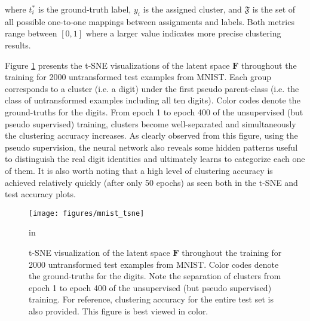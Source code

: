 \documentclass{article} \usepackage{iclr2018_conference,times}
\begin{document}
where $t^*_i$ is the ground-truth label, $y_i$ is the assigned cluster, and $\mathfrak{F}$ is the set of all possible one-to-one mappings between assignments and labels. Both metrics range between $[0, 1]$ where a larger value indicates more precise clustering results.

Figure \ref{fig:pseudo_img_tsne} presents the t-SNE \citep{maaten2008tsne} visualizations of the latent space $\boldsymbol{F}$ throughout the training for 2000 untransformed test examples from MNIST. Each group corresponds to a cluster (i.e. a digit) under the first pseudo parent-class (i.e. the class of untransformed examples including all ten digits). Color codes denote the ground-truths for the digits. From epoch 1 to epoch 400 of the unsupervised (but pseudo supervised) training, clusters become well-separated and simultaneously the clustering accuracy increases. As clearly observed from this figure, using the pseudo supervision, the neural network also reveals some hidden patterns useful to distinguish the real digit identities and ultimately learns to categorize each one of them. It is also worth noting that a high level of clustering accuracy is achieved relatively quickly (after only 50 epochs) as seen both in the t-SNE and test accuracy plots.
\begin{figure}[h]
	\begin{center}
		\centerline{\texttt{[image: figures/mnist\_tsne]}}
		\caption{t-SNE visualization of the latent space $\boldsymbol{F}$ throughout the training for 2000 untransformed test examples from MNIST. Color codes denote the ground-truths for the digits. Note the separation of clusters from epoch 1 to epoch 400 of the unsupervised (but pseudo supervised) training. For reference, clustering accuracy for the entire test set is also provided. This figure is best viewed in color.}
		\label{fig:pseudo_img_tsne}
	\end{center}
	 in
\end{figure}
\end{document}
